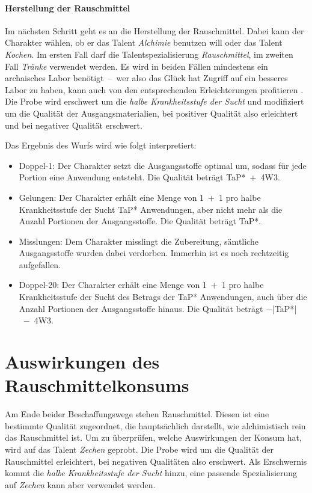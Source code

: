 \paragraph{Herstellung der Rauschmittel}
Im nächsten Schritt geht es an die Herstellung der Rauschmittel. Dabei kann der Charakter wählen, ob er das Talent \emph{Alchimie} benutzen will oder das Talent \emph{Kochen}. Im ersten Fall darf die Talentspezialisierung \emph{Rauschmittel}, im zweiten Fall \emph{Tränke} verwendet werden. Es wird in beiden Fällen mindestens ein archaisches Labor benötigt~--~wer also das Glück hat Zugriff auf ein besseres Labor zu haben, kann auch von den entsprechenden Erleichterungen profitieren \cite[S.~16]{WdA}. Die Probe wird erschwert um die \emph{halbe Krankheitsstufe der Sucht} und modifiziert um die Qualität der Ausgangsmaterialien, bei positiver Qualität also erleichtert und bei negativer Qualität erschwert.

Das Ergebnis des Wurfs wird wie folgt interpretiert:
\begin{itemize}
	\item Doppel-1: Der Charakter setzt die Ausgangsstoffe optimal um, sodass für jede Portion eine Anwendung entsteht. Die Qualität beträgt TaP*~+~4W3.
	\item Gelungen: Der Charakter erhält eine Menge von 1~+~1 pro halbe Krankheitsstufe der Sucht TaP* Anwendungen, aber nicht mehr als die Anzahl Portionen der Ausgangsstoffe. Die Qualität beträgt TaP*.
	\item Misslungen: Dem Charakter misslingt die Zubereitung, sämtliche Ausgangsstoffe wurden dabei verdorben. Immerhin ist es noch rechtzeitig aufgefallen.
	\item Doppel-20: Der Charakter erhält eine Menge von 1~+~1 pro halbe Krankheitsstufe der Sucht des Betrags der TaP* Anwendungen, auch über die Anzahl Portionen der Ausgangsstoffe hinaus. Die Qualität beträgt −|TaP*|~−~4W3.
\end{itemize}

\section{Auswirkungen des Rauschmittelkonsums\label{auswirkungen}}
Am Ende beider Beschaffungswege stehen Rauschmittel. Diesen ist eine bestimmte Qualität zugeordnet, die hauptsächlich darstellt, wie alchimistisch rein das Rauschmittel ist. Um zu überprüfen, welche Auswirkungen der Konsum hat, wird auf das Talent \emph{Zechen} geprobt. Die Probe wird um die Qualität der Rauschmittel erleichtert, bei negativen Qualitäten also erschwert. Als Erschwernis kommt die \emph{halbe Krankheitsstufe der Sucht} hinzu, eine passende Spezialisierung auf \emph{Zechen} kann aber verwendet werden.

